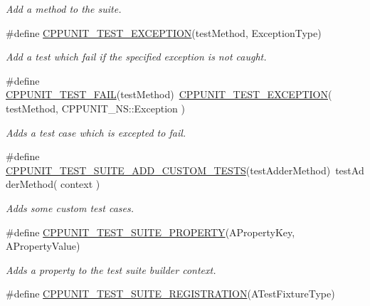 \begin{DoxyCompactItemize}
\begin{DoxyCompactList}\small\item\em Add a method to the suite. \end{DoxyCompactList}\item 
\#define \hyperlink{group___writing_test_fixture_gaca8eeb6f60714baade6cbfd185868c40}{C\+P\+P\+U\+N\+I\+T\+\_\+\+T\+E\+S\+T\+\_\+\+E\+X\+C\+E\+P\+T\+I\+O\+N}(test\+Method, Exception\+Type)
\begin{DoxyCompactList}\small\item\em Add a test which fail if the specified exception is not caught. \end{DoxyCompactList}\item 
\#define \hyperlink{group___writing_test_fixture_ga5bdaf0444216a8f93ead13d5ae964d7e}{C\+P\+P\+U\+N\+I\+T\+\_\+\+T\+E\+S\+T\+\_\+\+F\+A\+I\+L}(test\+Method)~\hyperlink{group___writing_test_fixture_gaca8eeb6f60714baade6cbfd185868c40}{C\+P\+P\+U\+N\+I\+T\+\_\+\+T\+E\+S\+T\+\_\+\+E\+X\+C\+E\+P\+T\+I\+O\+N}( test\+Method, C\+P\+P\+U\+N\+I\+T\+\_\+\+N\+S\+::\+Exception )
\begin{DoxyCompactList}\small\item\em Adds a test case which is excepted to fail. \end{DoxyCompactList}\item 
\#define \hyperlink{group___writing_test_fixture_ga516fec19cd7a7acb6fbf194bd98c4c09}{C\+P\+P\+U\+N\+I\+T\+\_\+\+T\+E\+S\+T\+\_\+\+S\+U\+I\+T\+E\+\_\+\+A\+D\+D\+\_\+\+C\+U\+S\+T\+O\+M\+\_\+\+T\+E\+S\+T\+S}(test\+Adder\+Method)~test\+Adder\+Method( context )
\begin{DoxyCompactList}\small\item\em Adds some custom test cases. \end{DoxyCompactList}\item 
\#define \hyperlink{group___writing_test_fixture_gac5ac4d8544ac2648a28bf7e4dcb27b9d}{C\+P\+P\+U\+N\+I\+T\+\_\+\+T\+E\+S\+T\+\_\+\+S\+U\+I\+T\+E\+\_\+\+P\+R\+O\+P\+E\+R\+T\+Y}(A\+Property\+Key, A\+Property\+Value)
\begin{DoxyCompactList}\small\item\em Adds a property to the test suite builder context. \end{DoxyCompactList}\item 
\#define \hyperlink{group___creating_test_suite_ga2f4071eec88d1e306665ada0f2dd80e4}{C\+P\+P\+U\+N\+I\+T\+\_\+\+T\+E\+S\+T\+\_\+\+S\+U\+I\+T\+E\+\_\+\+R\+E\+G\+I\+S\+T\+R\+A\+T\+I\+O\+N}(A\+Test\+Fixture\+Type)
\item 

\end{DoxyCompactItemize}
